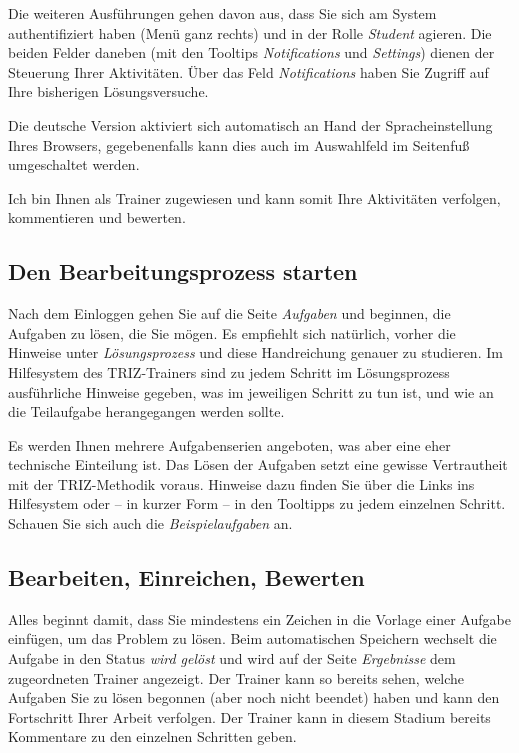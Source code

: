 \documentclass[11pt,a4paper]{article}
\begin{document}
Die weiteren Ausführungen gehen davon aus, dass Sie sich am System
authentifiziert haben (Menü ganz rechts) und in der Rolle \emph{Student}
agieren.  Die beiden Felder daneben (mit den Tooltips \emph{Notifications} und
\emph{Settings}) dienen der Steuerung Ihrer Aktivitäten. Über das Feld
\emph{Notifications} haben Sie Zugriff auf Ihre bisherigen Lösungsversuche.

Die deutsche Version aktiviert sich automatisch an Hand der Spracheinstellung
Ihres Browsers, gegebenenfalls kann dies auch im Auswahlfeld im Seitenfuß
umgeschaltet werden.

Ich bin Ihnen als Trainer zugewiesen und kann somit Ihre Aktivitäten
verfolgen, kommentieren und bewerten.

\subsection{Den Bearbeitungsprozess starten}

Nach dem Einloggen gehen Sie auf die Seite \emph{Aufgaben} und beginnen, die
Aufgaben zu lösen, die Sie mögen.  Es empfiehlt sich natürlich, vorher die
Hinweise unter \emph{Lösungsprozess} und diese Handreichung genauer zu
studieren.  Im Hilfesystem des TRIZ-Trainers sind zu jedem Schritt im
Lösungsprozess ausführliche Hinweise gegeben, was im jeweiligen Schritt zu tun
ist, und wie an die Teilaufgabe herangegangen werden sollte.

Es werden Ihnen mehrere Aufgabenserien angeboten, was aber eine eher
technische Einteilung ist.  Das Lösen der Aufgaben setzt eine gewisse
Vertrautheit mit der TRIZ-Methodik voraus. Hinweise dazu finden Sie über die
Links ins Hilfesystem oder -- in kurzer Form -- in den Tooltipps zu jedem
einzelnen Schritt. Schauen Sie sich auch die \emph{Beispielaufgaben} an.

\subsection{Bearbeiten, Einreichen, Bewerten} 

Alles beginnt damit, dass Sie mindestens ein Zeichen in die Vorlage einer
Aufgabe einfügen, um das Problem zu lösen. Beim automatischen Speichern
wechselt die Aufgabe in den Status \emph{wird gelöst} und wird auf der Seite
\emph{Ergebnisse} dem zugeordneten Trainer angezeigt. Der Trainer kann so
bereits sehen, welche Aufgaben Sie zu lösen begonnen (aber noch nicht beendet)
haben und kann den Fortschritt Ihrer Arbeit verfolgen. Der Trainer kann in
diesem Stadium bereits Kommentare zu den einzelnen Schritten geben.
\end{document}
